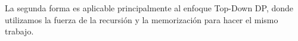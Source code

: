 La segunda forma es aplicable principalmente al enfoque Top-Down DP, donde utilizamos la fuerza de la recursión y la memorización para hacer el mismo trabajo. 



